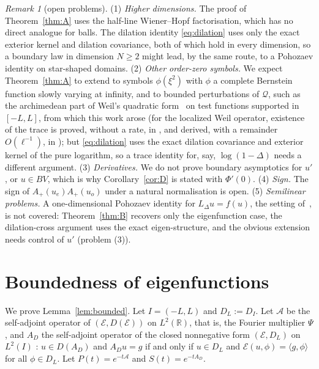 \documentclass[11pt]{amsart}
\newcommand{\R}{\mathbb{R}}
\newcommand{\E}{\mathcal{E}}
\newcommand{\LD}{L_\Delta}
\theoremstyle{definition}
\theoremstyle{remark}
\newtheorem{remark}[theorem]{Remark}
\numberwithin{equation}{section}
\begin{document}
\begin{remark}[open problems]
(1) \emph{Higher dimensions.} The proof of Theorem~\ref{thm:A} uses the half-line Wiener--Hopf factorisation, which has no direct analogue for balls. The dilation identity \eqref{eq:dilation} uses only the exact exterior kernel and dilation covariance, both of which hold in every dimension, so a boundary law in dimension $N\ge2$ might lead, by the same route, to a Pohozaev identity on star-shaped domains. (2) \emph{Other order-zero symbols.} We expect Theorem~\ref{thm:A} to extend to symbols $\phi(\xi^2)$ with $\phi$ a complete Bernstein function slowly varying at infinity, and to bounded perturbations of $\mathcal Q$, such as the archimedean part of Weil's quadratic form~\cite{Weil} on test functions supported in $[-L,L]$, from which this work arose (for the localized Weil operator, existence of the trace is proved, without a rate, in \cite[\S3.3]{BT26}, and derived, with a remainder $O(\ell^{-1})$, in \cite[PL-319--PL-323, PL-329, PL-336, PL-337]{Mathia26}); but \eqref{eq:dilation} uses the exact dilation covariance and exterior kernel of the pure logarithm, so a trace identity for, say, $\log(1-\Delta)$ needs a different argument. (3) \emph{Derivatives.} We do not prove boundary asymptotics for $u'$, or $u\in BV$, which is why Corollary~\ref{cor:D} is stated with $\Phi'(0)$. (4) \emph{Sign.} The sign of $A_+(u_e)A_+(u_o)$ under a natural normalisation is open. (5) \emph{Semilinear problems.} A one-dimensional Pohozaev identity for $\LD u=f(u)$, the setting of~\cite{AGV24}, is not covered: Theorem~\ref{thm:B} recovers only the eigenfunction case, the dilation-cross argument uses the exact eigen-structure, and the obvious extension needs control of $u'$ (problem (3)).
\end{remark}


\appendix
\section{Boundedness of eigenfunctions}\label{app:bounded}

We prove Lemma~\ref{lem:bounded}. Let $I=(-L,L)$ and $D_L:=D_I$. Let $\mathcal A$ be the self-adjoint operator of $(\E,D(\E))$ on $L^2(\R)$, that is, the Fourier multiplier $\Psi$, and $A_D$ the self-adjoint operator of the closed nonnegative form $(\E,D_L)$ on $L^2(I)$ \cite[Thm.~VI.2.1]{Kato95}: $u\in D(A_D)$ and $A_Du=g$ if and only if $u\in D_L$ and $\E(u,\phi)=\langle g,\phi\rangle$ for all $\phi\in D_L$. Let $P(t)=e^{-t\mathcal A}$ and $S(t)=e^{-tA_D}$.
\end{document}
